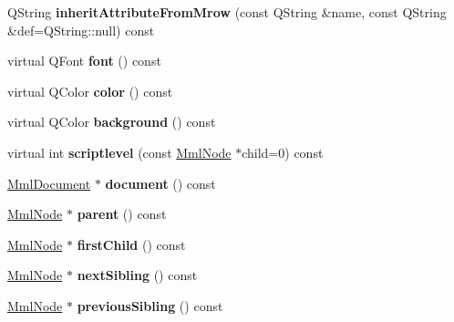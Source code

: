 \begin{DoxyCompactItemize}
\mbox{\label{class_mml_node_ab7f0378c12180ad0d3e4b10f130a8bcc}} 
Q\+String {\bfseries inherit\+Attribute\+From\+Mrow} (const Q\+String \&name, const Q\+String \&def=Q\+String\+::null) const
\item 
\mbox{\label{class_mml_node_a7524cdcf3edd3922b41bbce0c9584ef3}} 
virtual Q\+Font {\bfseries font} () const
\item 
\mbox{\label{class_mml_node_a14665a51194a7b785f5912452dc8d5cf}} 
virtual Q\+Color {\bfseries color} () const
\item 
\mbox{\label{class_mml_node_a8c2f58a39a3443510c9d85ad17694676}} 
virtual Q\+Color {\bfseries background} () const
\item 
\mbox{\label{class_mml_node_a0d7ab5ead3f1ea457d123eabc22330f7}} 
virtual int {\bfseries scriptlevel} (const \mbox{\hyperlink{class_mml_node}{Mml\+Node}} $\ast$child=0) const
\item 
\mbox{\label{class_mml_node_aba9d9e3b8b305de636b27685f38dd32c}} 
\mbox{\hyperlink{class_mml_document}{Mml\+Document}} $\ast$ {\bfseries document} () const
\item 
\mbox{\label{class_mml_node_af0a900b3cc196f3190cdcd9d18923d5d}} 
\mbox{\hyperlink{class_mml_node}{Mml\+Node}} $\ast$ {\bfseries parent} () const
\item 
\mbox{\label{class_mml_node_aeac7104cf5c6aa3b38419bfe773d8d96}} 
\mbox{\hyperlink{class_mml_node}{Mml\+Node}} $\ast$ {\bfseries first\+Child} () const
\item 
\mbox{\label{class_mml_node_a0f15c0bfe15606838024008bcea54a67}} 
\mbox{\hyperlink{class_mml_node}{Mml\+Node}} $\ast$ {\bfseries next\+Sibling} () const
\item 
\mbox{\label{class_mml_node_a91d5bd19285090be43aac4d5e5a0e114}} 
\mbox{\hyperlink{class_mml_node}{Mml\+Node}} $\ast$ {\bfseries previous\+Sibling} () const
\item 
\mbox{\label{class_mml_node_ac6c8896970baf46e342083eb24ba0d3e}} 

\end{DoxyCompactItemize}
